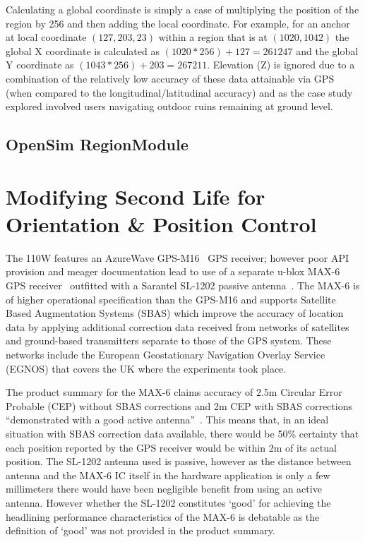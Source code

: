 Calculating a global coordinate is simply a case of multiplying the position of the region by 256 and then adding the local coordinate. For example, for an anchor at local coordinate $(127,203,23)$ within a region that is at $(1020,1042)$ the global X coordinate is calculated as $(1020 * 256) + 127 = 261247$ and the global Y coordinate as $(1043 * 256) + 203 = 267211$. Elevation (Z) is ignored due to a combination of the relatively low accuracy of these data attainable via GPS (when compared to the longitudinal/latitudinal accuracy) and as the case study explored involved users navigating outdoor ruins remaining at ground level.


\subsection{OpenSim RegionModule}


\section{Modifying Second Life for Orientation \& Position Control}


The 110W features an AzureWave GPS-M16~\cite{AzureWave} GPS receiver; however poor API provision and meager documentation lead to use of a separate u-blox MAX-6 GPS receiver~\cite{U-bloxAG} outfitted with a Sarantel SL-1202 passive antenna~\cite{Sarantel}. The MAX-6 is of higher operational specification than the GPS-M16 and supports Satellite Based Augmentation Systems (SBAS) which improve the accuracy of location data by applying additional correction data received from networks of satellites and ground-based transmitters separate to those of the GPS system. These networks include the European Geostationary Navigation Overlay Service (EGNOS) that covers the UK where the experiments took place.

The product summary for the MAX-6 claims accuracy of 2.5m Circular Error Probable (CEP) without SBAS corrections and 2m CEP with SBAS corrections ``demonstrated with a good active antenna''~\cite{U-bloxAG2012}. This means that, in an ideal situation with SBAS correction data available, there would be 50\% certainty that each position reported by the GPS receiver would be within 2m of its actual position. The SL-1202 antenna used is passive, however as the distance between antenna and the MAX-6 IC itself in the hardware application is only a few millimeters there would have been negligible benefit from using an active antenna. However whether the SL-1202 constitutes `good' for achieving the headlining performance characteristics of the MAX-6 is debatable as the definition of `good' was not provided in the product summary.

